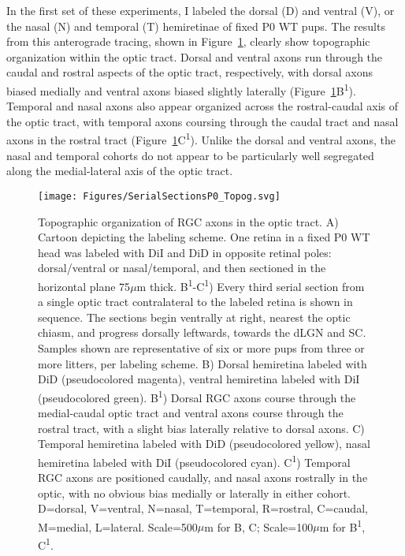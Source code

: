 In the first set of these experiments, I labeled the dorsal (D) and ventral (V), or the nasal (N) and temporal (T) hemiretinae of fixed P0 WT pups.
The results from this anterograde tracing, shown in Figure~\ref{Figures/SerialSectionsP0_Topog}, clearly show topographic organization within the optic tract.
Dorsal and ventral axons run through the caudal and rostral aspects of the optic tract, respectively, with dorsal axons biased medially and ventral axons biased slightly laterally (Figure~\ref{Figures/SerialSectionsP0_Topog}B\textsuperscript{1}).
Temporal and nasal axons also appear organized across the rostral-caudal axis of the optic tract, with temporal axons coursing through the caudal tract and nasal axons in the rostral tract (Figure~\ref{Figures/SerialSectionsP0_Topog}C\textsuperscript{1}).
Unlike the dorsal and ventral axons, the nasal and temporal cohorts do not appear to be particularly well segregated along the medial-lateral axis of the optic tract.
\begin{figure}[hbtp]
	\begin{center}
		\texttt{[image: Figures/SerialSectionsP0\_Topog.svg]}
		\caption[Topographic organization of RGC axons in the optic tract.]
		{Topographic organization of RGC axons in the optic tract.
		A) Cartoon depicting the labeling scheme.
		One retina in a fixed P0 WT head was labeled with DiI and DiD in opposite retinal poles: dorsal/ventral or nasal/temporal, and then sectioned in the horizontal plane 75$\mu$m thick.
		B\textsuperscript{1}-C\textsuperscript{1}) Every third serial section from a single optic tract contralateral to the labeled retina is shown in sequence.
		The sections begin ventrally at right, nearest the optic chiasm, and progress dorsally leftwards, towards the dLGN and SC.
		Samples shown are representative of six or more pups from three or more litters, per labeling scheme. %
		B) Dorsal hemiretina labeled with DiD (pseudocolored magenta), ventral hemiretina labeled with DiI (pseudocolored green).
		B\textsuperscript{1}) Dorsal RGC axons course through the medial-caudal optic tract and ventral axons course through the rostral tract, with a slight bias laterally relative to dorsal axons.
		C) Temporal hemiretina labeled with DiD (pseudocolored yellow), nasal hemiretina labeled with DiI (pseudocolored cyan).
		C\textsuperscript{1}) Temporal RGC axons are positioned caudally, and nasal axons rostrally in the optic, with no obvious bias medially or laterally in either cohort.
		D=dorsal, V=ventral, N=nasal, T=temporal, R=rostral, C=caudal, M=medial, L=lateral. Scale=500$\mu$m for B, C; Scale=100$\mu$m for B\textsuperscript{1}, C\textsuperscript{1}.}
		\label{Figures/SerialSectionsP0_Topog}
	\end{center}
\end{figure}

